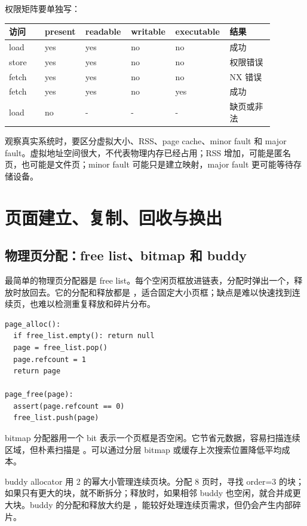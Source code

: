 权限矩阵要单独写：

\begin{longtable}{|p{0.13\linewidth}|p{0.14\linewidth}|p{0.15\linewidth}|p{0.15\linewidth}|p{0.15\linewidth}|p{0.16\linewidth}|}
\toprule
访问 & present & readable & writable & executable & 结果 \\
\midrule
load & yes & yes & no & no & 成功 \\\tablerowrule
store & yes & yes & no & no & 权限错误 \\\tablerowrule
fetch & yes & yes & no & no & NX 错误 \\\tablerowrule
fetch & yes & yes & no & yes & 成功 \\\tablerowrule
load & no & - & - & - & 缺页或非法 \\
\bottomrule
\end{longtable}

观察真实系统时，要区分虚拟大小、RSS、page cache、minor fault 和 major fault。虚拟地址空间很大，不代表物理内存已经占用；RSS 增加，可能是匿名页，也可能是文件页；minor fault 可能只是建立映射，major fault 更可能等待存储设备。

\section{页面建立、复制、回收与换出}

\subsection{物理页分配：free list、bitmap 和 buddy}

最简单的物理页分配器是 free list。每个空闲页框放进链表，分配时弹出一个，释放时放回去。它的分配和释放都是 ，适合固定大小页框；缺点是难以快速找到连续页，也难以检测重复释放和碎片分布。

\begin{lstlisting}
page_alloc():
  if free_list.empty(): return null
  page = free_list.pop()
  page.refcount = 1
  return page

page_free(page):
  assert(page.refcount == 0)
  free_list.push(page)
\end{lstlisting}

bitmap 分配器用一个 bit 表示一个页框是否空闲。它节省元数据，容易扫描连续区域，但朴素扫描是 。可以通过分层 bitmap 或缓存上次搜索位置降低平均成本。

buddy allocator 用 2 的幂大小管理连续页块。分配 8 页时，寻找 order=3 的块；如果只有更大的块，就不断拆分；释放时，如果相邻 buddy 也空闲，就合并成更大块。buddy 的分配和释放大约是 ，能较好处理连续页需求，但仍会产生内部碎片。


